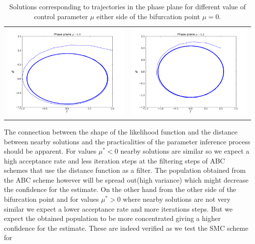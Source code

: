 \begin{table}[ht]
\begin{tabular}{cc}
\includegraphics[scale=0.3]{phase_hopf08}&\includegraphics[scale=0.3]{phase_hopf12}\\
\end{tabular}
\caption{Solutions corresponding to trajectories in the phase plane for different value of
control parameter $\mu$ either side of the bifurcation point $\mu = 0$.}
\label{fig:phase_plane_hopf}
\end{table}

The connection between the shape of the likelihood function and the distance between nearby solutions and the practicalities of the parameter inference process should be apparent. For values $\mu^* < 0$ nearby solutions are similar so we expect a high acceptance rate and less iteration steps at the filtering steps of ABC schemes that use the distance function as a filter. The population obtained from the ABC scheme however will be spread out(high variance) which might decrease the confidence for the estimate. On the other hand from the other side of the bifurcation point and for values $\mu^* > 0$ where nearby solutions are not very similar we expect a lower acceptance rate and more iterations steps. But we expect the obtained population to be more concentrated giving a higher confidence for the estimate. These are indeed verified as we test the SMC scheme for%

